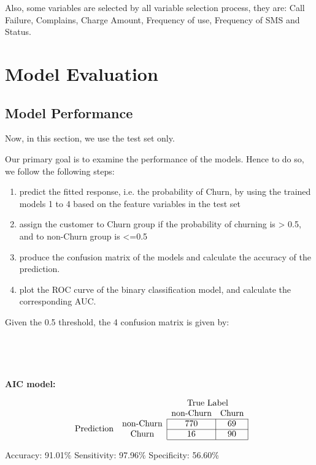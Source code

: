 \documentclass[11pt]{article}
\begin{document}
Also, some variables are selected by all variable selection process, they are: Call Failure, Complains, Charge Amount, Frequency of use, Frequency of SMS and Status. 

\section{Model Evaluation}

\subsection{Model Performance}

Now, in this section, we use the test set only. 

Our primary goal is to examine the performance of the models. Hence to do so, we follow the following steps: 

\begin{enumerate}
    \item predict the fitted response, i.e. the probability of Churn, by using the trained models 1 to 4 based on the feature variables in the test set
    \item assign the customer to Churn group if the probability of churning is > 0.5, and to non-Churn group is <=0.5
    \item produce the confusion matrix of the models and calculate the accuracy of the prediction. 
    \item plot the ROC curve of the binary classification model, and calculate the corresponding AUC. 
\end{enumerate}

Given the 0.5 threshold, the 4 confusion matrix is given by: 

\

\

\textbf{AIC model: }

$$
\begin{array}{cc|c|c|}
& \multicolumn{1}{c}{} & \multicolumn{2}{c}{\text{True Label}} \\
& \multicolumn{1}{c}{} & \multicolumn{1}{c}{\text{non-Churn}} & \multicolumn{1}{c}{\text{Churn}} \\ \cline{3-4}
\multirow{2}{*}{\text{Prediction}} & \text{non-Churn} & 770 & 69 \\ \cline{3-4}
& \text{Churn} & 16 & 90 \\ \cline{3-4}
\end{array}
$$

Accuracy: 91.01\%
Sensitivity: 97.96\%    
Specificity: 56.60\% 
\end{document}
